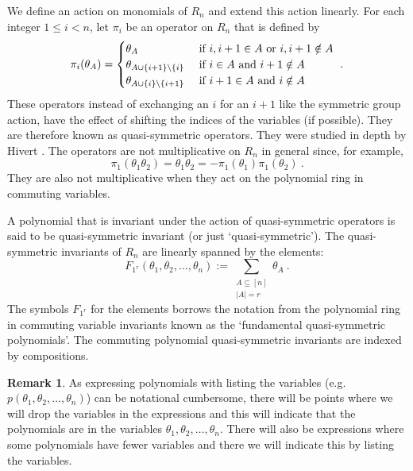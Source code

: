 \documentclass[11pt]{amsart}
\theoremstyle{definition}
\newtheorem{remark}[theorem]{Remark}
\numberwithin{equation}{section}
\begin{document}
We define an action on monomials of $R_n$ and extend this action linearly.
For each integer $1 \leq i < n$, let $\pi_i$ be an operator on $R_n$
that is defined by
\begin{equation}\label{eq:pi}
\pi_i(\theta_A) = \begin{cases}
\theta_{A} & \hbox{ if } i, i+1 \in A\hbox{ or }i, i+1 \notin A\\
\theta_{A \cup \{i+1\} \backslash \{i\}} & \hbox{ if } i\in A\hbox{ and }i+1 \notin A\\
\theta_{A \cup \{i\} \backslash \{i+1\}} & \hbox{ if } i+1\in A\hbox{ and }i \notin A
\end{cases}~.
\end{equation}
These operators instead of exchanging an $i$ for an $i+1$ like the symmetric group
action, have the effect of shifting the indices of the variables (if possible).  They
are therefore known as quasi-symmetric operators.  They were studied in depth by
Hivert \cite{Hi}.  The operators are not multiplicative on $R_n$ in general since, for example,
\[
\pi_1( \theta_{1} \theta_{2})
= \theta_1 \theta_2
= - \pi_1( \theta_{1}) \pi_1(\theta_{2})~.
\]
They are also not multiplicative when they act on the polynomial ring
in commuting variables.

A polynomial that is invariant under the action of quasi-symmetric operators
is said to be quasi-symmetric invariant (or just `quasi-symmetric').
The quasi-symmetric invariants of $R_n$ are
linearly spanned by the elements:
\begin{equation}\label{eq:defF}
F_{1^r}(\theta_1, \theta_2, \ldots, \theta_n) := \sum_{\substack{A \subseteq [n]\\|A|=r}} \theta_A~.
\end{equation}
The symbols $F_{1^r}$ for the elements borrows the notation from the
polynomial ring in commuting variable invariants known as the `fundamental
quasi-symmetric polynomials'.  The commuting polynomial quasi-symmetric
invariants are indexed by compositions.

\begin{remark}
As expressing polynomials with listing the variables
(e.g. $p(\theta_1, \theta_2, \ldots, \theta_n)$) can be notational cumbersome,
there will be points where we will drop the variables in the expressions
and this will indicate that the polynomials are in the
variables $\theta_1, \theta_2, \ldots, \theta_n$.  There will also
be expressions where some polynomials have fewer variables and there
we will indicate this by listing the variables.
\end{remark}
\end{document}
